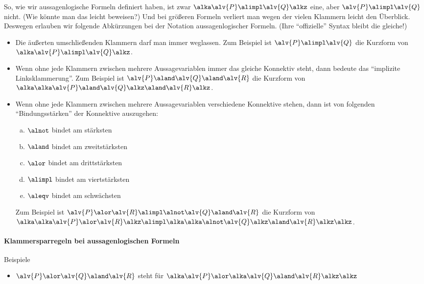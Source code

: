 So, wie wir aussagenlogische Formeln definiert haben, ist zwar
$\alka\alv{P}\alimpl\alv{Q}\alkz$ eine, aber $\alv{P}\alimpl\alv{Q}$
nicht.
%
(Wie könnte man das leicht beweisen?)
%
Und bei größeren Formeln verliert man wegen der vielen Klammern leicht
den Überblick.
%
Deswegen erlauben wir folgende Abkürzungen bei der Notation
aussagenlogischer Formeln.
%
(Ihre "`offizielle"' Syntax bleibt die gleiche!)
%
\begin{itemize}
\item Die äußerten umschließenden Klammern darf man immer weglassen.
  Zum Beispiel ist $\alv{P}\alimpl\alv{Q}$ die Kurzform von
  $\alka\alv{P}\alimpl\alv{Q}\alkz$.
\item Wenn ohne jede Klammern zwischen mehrere Aussagevariablen immer
  das gleiche Konnektiv steht, dann bedeute das "`implizite
  Linksklammerung"'.
  Zum Beispiel ist $\alv{P}\aland\alv{Q}\aland\alv{R}$ die Kurzform von
  $\alka\alka\alv{P}\aland\alv{Q}\alkz\aland\alv{R}\alkz$.
\item Wenn ohne jede Klammern zwischen mehrere Aussagevariablen
  verschiedene Konnektive stehen, dann ist von folgenden
  "`Bindungsstärken"' der Konnektive auszugehen:
  \begin{enumerate}[a)]
  \item $\alnot$ bindet am stärksten
  \item $\aland$ bindet am zweitstärksten
  \item $\alor$ bindet am drittstärksten
  \item $\alimpl$ bindet am viertstärksten
  \item $\aleqv$ bindet am schwächsten
  \end{enumerate}
  Zum Beispiel ist
  $\alv{P}\alor\alv{R}\alimpl\alnot\alv{Q}\aland\alv{R}$ die Kurzform
  von
  $\alka \alka\alv{P}\alor\alv{R}\alkz \alimpl %
         \alka \alka\alnot\alv{Q}\alkz \aland\alv{R}\alkz 
   \alkz$.
\end{itemize}
%
\begin{tutorium}
  \paragraph{Klammersparregeln bei aussagenlogischen Formeln}

  Beispiele
  \begin{itemize}
  \item $\alv{P}\alor\alv{Q}\aland\alv{R}$ steht für %
    $\alka \alv{P}\alor \alka\alv{Q}\aland\alv{R}\alkz \alkz$
  \end{itemize}
\end{tutorium}

